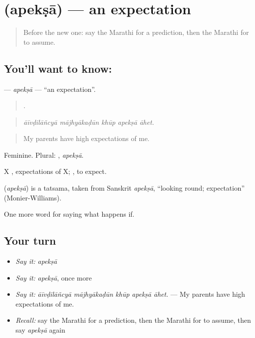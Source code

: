 \section[\texorpdfstring{\mr{अपेक्षा} (apekṣā)}{अपेक्षा (apekṣā)}]{ (apekṣā) — an expectation}

\label{lesson:MR-C383-apeksa}



\begin{quote}
Before the new one: say the Marathi for a prediction, then the Marathi for to assume.
\end{quote}

\subsection*{You'll want to know: }
\textbf{} — \emph{apekṣā} — \textquotedblleft{}an expectation\textquotedblright{}.

\begin{quote}
    .
\end{quote}

\begin{quote}
\emph{āīvḍilāñcyā mājhyākaḍūn khūp apekṣā āhet.}
\end{quote}

\begin{quote}
My parents have high expectations of me.
\end{quote}

Feminine. Plural: , \emph{apekṣā}.

X  , expectations of X;  , to expect.

\begin{cousinweb}
\textbf{} (\emph{apekṣā}) is a tatsama, taken from Sanskrit \emph{apekṣā}, \textquotedblleft{}looking round; expectation\textquotedblright{} (Monier-Williams).
\end{cousinweb}

\begin{grammarlens}[title={What you've built}]
One more word for saying what happens if.
\end{grammarlens}

\subsection*{Your turn}
\begin{itemize}
\raggedright
  \item \emph{Say it:} \emph{apekṣā}
  \item \emph{Say it:} \emph{apekṣā}, once more
  \item \emph{Say it:} \emph{āīvḍilāñcyā mājhyākaḍūn khūp apekṣā āhet.} — My parents have high expectations of me.
  \item \emph{Recall:} say the Marathi for a prediction, then the Marathi for to assume, then say \emph{apekṣā} again
\end{itemize}

